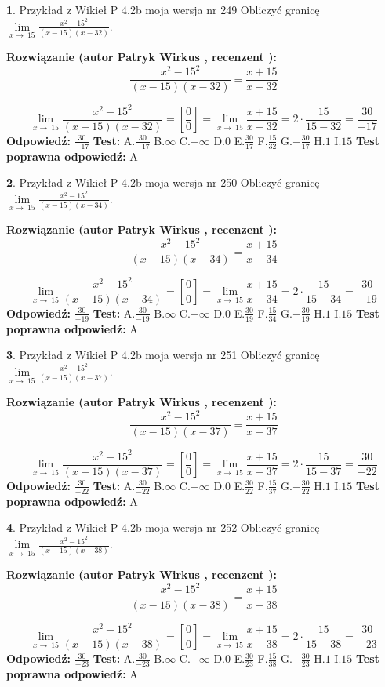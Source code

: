 \documentclass[12pt, a4paper]{article}
\theoremstyle{definition} %
\newtheorem{zad}{}
\newcommand{\zadStart}[1]{\begin{zad}#1\newline}
\newcommand{\zadStop}{\end{zad}}
\newcommand{\rozwStart}[2]{\noindent \textbf{Rozwiązanie (autor #1 , recenzent #2): }\newline}
\newcommand{\rozwStop}{\newline}
\newcommand{\odpStart}{\noindent \textbf{Odpowiedź:}\newline}
\newcommand{\odpStop}{\newline}
\newcommand{\testStart}{\noindent \textbf{Test:}\newline}
\newcommand{\testStop}{\newline}
\newcommand{\kluczStart}{\noindent \textbf{Test poprawna odpowiedź:}\newline}
\newcommand{\kluczStop}{\newline}
\begin{document}
\zadStart{Przykład z Wikieł P 4.2b moja wersja nr 249}
Obliczyć granicę $\lim\limits_{x\to\ 15}\frac{x^{2}-15^{2}}{(x-15)(x-32)}$.
\zadStop
\rozwStart{Patryk Wirkus}{}
$$\frac{x^{2}-15^{2}}{(x-15)(x-32)}=\frac{x+15}{x-32}$$

$$\lim\limits_{x\to\ 15}\frac{x^{2}-15^{2}}{(x-15)(x-32)}=[\frac{0}{0}]=\lim\limits_{x\to\ 15}\frac{x+15}{x-32}=2 \cdot \frac{15}{15-32} = \frac{30}{-17}$$
\rozwStop
\odpStart
$\frac{30}{-17}$
\odpStop
\testStart
A.$\frac{30}{-17}$
B.$\infty$
C.$-\infty$
D.$0$
E.$\frac{30}{17}$
F.$\frac{15}{32}$
G.$-\frac{30}{17}$
H.$1$
I.$15$
\testStop
\kluczStart
A
\kluczStop



\zadStart{Przykład z Wikieł P 4.2b moja wersja nr 250}
Obliczyć granicę $\lim\limits_{x\to\ 15}\frac{x^{2}-15^{2}}{(x-15)(x-34)}$.
\zadStop
\rozwStart{Patryk Wirkus}{}
$$\frac{x^{2}-15^{2}}{(x-15)(x-34)}=\frac{x+15}{x-34}$$

$$\lim\limits_{x\to\ 15}\frac{x^{2}-15^{2}}{(x-15)(x-34)}=[\frac{0}{0}]=\lim\limits_{x\to\ 15}\frac{x+15}{x-34}=2 \cdot \frac{15}{15-34} = \frac{30}{-19}$$
\rozwStop
\odpStart
$\frac{30}{-19}$
\odpStop
\testStart
A.$\frac{30}{-19}$
B.$\infty$
C.$-\infty$
D.$0$
E.$\frac{30}{19}$
F.$\frac{15}{34}$
G.$-\frac{30}{19}$
H.$1$
I.$15$
\testStop
\kluczStart
A
\kluczStop



\zadStart{Przykład z Wikieł P 4.2b moja wersja nr 251}
Obliczyć granicę $\lim\limits_{x\to\ 15}\frac{x^{2}-15^{2}}{(x-15)(x-37)}$.
\zadStop
\rozwStart{Patryk Wirkus}{}
$$\frac{x^{2}-15^{2}}{(x-15)(x-37)}=\frac{x+15}{x-37}$$

$$\lim\limits_{x\to\ 15}\frac{x^{2}-15^{2}}{(x-15)(x-37)}=[\frac{0}{0}]=\lim\limits_{x\to\ 15}\frac{x+15}{x-37}=2 \cdot \frac{15}{15-37} = \frac{30}{-22}$$
\rozwStop
\odpStart
$\frac{30}{-22}$
\odpStop
\testStart
A.$\frac{30}{-22}$
B.$\infty$
C.$-\infty$
D.$0$
E.$\frac{30}{22}$
F.$\frac{15}{37}$
G.$-\frac{30}{22}$
H.$1$
I.$15$
\testStop
\kluczStart
A
\kluczStop



\zadStart{Przykład z Wikieł P 4.2b moja wersja nr 252}
Obliczyć granicę $\lim\limits_{x\to\ 15}\frac{x^{2}-15^{2}}{(x-15)(x-38)}$.
\zadStop
\rozwStart{Patryk Wirkus}{}
$$\frac{x^{2}-15^{2}}{(x-15)(x-38)}=\frac{x+15}{x-38}$$

$$\lim\limits_{x\to\ 15}\frac{x^{2}-15^{2}}{(x-15)(x-38)}=[\frac{0}{0}]=\lim\limits_{x\to\ 15}\frac{x+15}{x-38}=2 \cdot \frac{15}{15-38} = \frac{30}{-23}$$
\rozwStop
\odpStart
$\frac{30}{-23}$
\odpStop
\testStart
A.$\frac{30}{-23}$
B.$\infty$
C.$-\infty$
D.$0$
E.$\frac{30}{23}$
F.$\frac{15}{38}$
G.$-\frac{30}{23}$
H.$1$
I.$15$
\testStop
\kluczStart
A
\kluczStop
\end{document}
